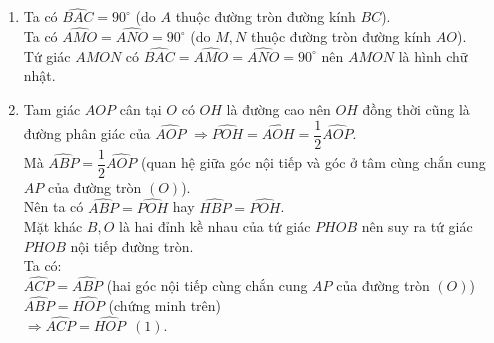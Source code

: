 \begin{bt}
{\begin{center}
\end{center}
\begin{enumerate}
\item 
	Ta có $\widehat{BAC}=90^\circ$ (do $A$ thuộc đường tròn đường kính $BC$).\\
	Ta có $\widehat{AMO}=\widehat{ANO}=90^\circ$ (do $M,N$ thuộc đường tròn đường kính $AO$).\\
	Tứ giác $AMON$ có $\widehat{BAC}=\widehat{AMO}=\widehat{ANO}=90^\circ$ nên $AMON$ là hình chữ nhật. 
\item 
	Tam giác $AOP$ cân tại $O$ có $OH$ là đường cao nên $OH$ đồng thời cũng là đường phân giác của $\widehat{AOP}$ $\Rightarrow \widehat{POH}=\widehat{AOH}=\dfrac{1}{2}\widehat{AOP}$.\\
	Mà $\widehat{ABP}=\dfrac{1}{2}\widehat{AOP}$ (quan hệ giữa góc nội tiếp và góc ở tâm cùng chắn cung $AP$ của đường tròn $(O)$).\\
	Nên ta có $\widehat{ABP}=\widehat{POH}$ hay $\widehat{HBP}=\widehat{POH}$.\\
	Mặt khác $B,O$ là hai đỉnh kề nhau của tứ giác $PHOB$ nên suy ra tứ giác $PHOB$ nội tiếp đường tròn.\\
	Ta có:\\
	$\widehat{ACP}=\widehat{ABP}$ (hai góc nội tiếp cùng chắn cung $AP$ của đường tròn $(O)$)\\
	$\widehat{ABP}=\widehat{HOP}$ (chứng minh trên)\\
	$\Rightarrow \widehat{ACP}=\widehat{HOP}\,\,\,(1)$.\\

\end{enumerate}}
\end{bt}
